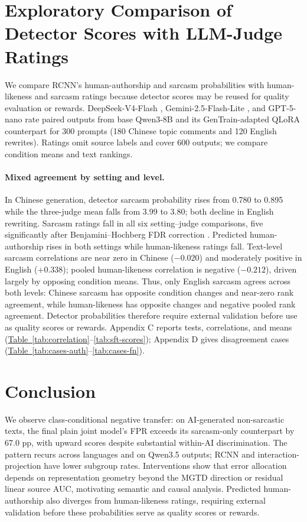 \documentclass[11pt]{article}
\newcommand{\Tabref}[1]{\hyperref[#1]{Table~\ref*{#1}}}
\begin{document}
\section{Exploratory Comparison of Detector Scores with LLM-Judge Ratings}
\label{sec:eval}

We compare RCNN's human-authorship and sarcasm probabilities with human-likeness and sarcasm ratings because detector scores may be reused for quality evaluation or rewards. DeepSeek-V4-Flash \citep{deepseek2026v4flash}, Gemini-2.5-Flash-Lite \citep{googledeepmind2025gemini25flashlite}, and GPT-5-nano \citep{openai2025gpt5} rate paired outputs from base Qwen3-8B \citep{qwen2025} and its GenTrain-adapted QLoRA counterpart \citep{dettmers2023qlora} for 300 prompts (180 Chinese topic comments and 120 English rewrites). Ratings omit source labels and cover 600 outputs; we compare condition means and text rankings.

\paragraph{Mixed agreement by setting and level.} In Chinese generation, detector sarcasm probability rises from 0.780 to 0.895 while the three-judge mean falls from 3.99 to 3.80; both decline in English rewriting. Sarcasm ratings fall in all six setting--judge comparisons, five significantly after Benjamini--Hochberg FDR correction \citep{benjamini1995fdr}. Predicted human-authorship rises in both settings while human-likeness ratings fall. Text-level sarcasm correlations are near zero in Chinese ($-0.020$) and moderately positive in English ($+0.338$); pooled human-likeness correlation is negative ($-0.212$), driven largely by opposing condition means. Thus, only English sarcasm agrees across both levels: Chinese sarcasm has opposite condition changes and near-zero rank agreement, while human-likeness has opposite changes and negative pooled rank agreement. Detector probabilities therefore require external validation before use as quality scores or rewards. Appendix C reports tests, correlations, and means (\Tabref{tab:correlation}--\ref{tab:sft-scores}); Appendix D gives disagreement cases (\Tabref{tab:cases-auth}--\ref{tab:cases-fn}).

\section{Conclusion}
\label{sec:conclusion}

We observe class-conditional negative transfer: on AI-generated non-sarcastic texts, the final plain joint model's FPR exceeds its sarcasm-only counterpart by 67.0 pp, with upward scores despite substantial within-AI discrimination. The pattern recurs across languages and on Qwen3.5 outputs; RCNN and interaction-projection have lower subgroup rates. Interventions show that error allocation depends on representation geometry beyond the MGTD direction or residual linear source AUC, motivating semantic and causal analysis. Predicted human-authorship also diverges from human-likeness ratings, requiring external validation before these probabilities serve as quality scores or rewards.
\end{document}
